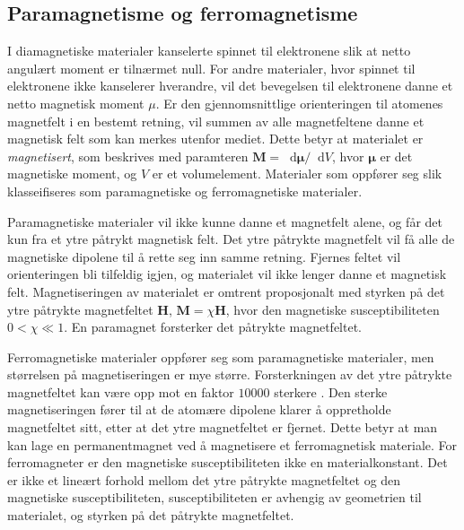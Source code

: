 \documentclass[%
 reprint,
 amsmath,amssymb,
 aps,
]{revtex4-1}
\newcommand*\diff{\mathop{}\!\mathrm{d}}
\begin{document}
\subsection{Paramagnetisme og ferromagnetisme}
I diamagnetiske materialer kanselerte spinnet til elektronene slik at netto angulært moment er tilnærmet null. For andre materialer, hvor spinnet til elektronene ikke kanselerer hverandre, vil det bevegelsen til elektronene danne et netto magnetisk moment $\mu$. Er den gjennomsnittlige orienteringen til atomenes magnetfelt i en bestemt retning, vil summen av alle magnetfeltene danne et magnetisk felt som kan merkes utenfor mediet. Dette betyr at materialet er \textit{magnetisert}, som beskrives med paramteren $\bm{M} = \diff\bm{\mu}/\diff V$, hvor $\bm{\mu}$ er det magnetiske moment, og $V$ er et volumelement. Materialer som oppfører seg slik klasseifiseres som paramagnetiske og ferromagnetiske materialer.\par
Paramagnetiske materialer vil ikke kunne danne et magnetfelt alene, og får det kun fra et ytre påtrykt magnetisk felt. Det ytre påtrykte magnetfelt vil få alle de magnetiske dipolene til å rette seg inn samme retning. Fjernes feltet vil orienteringen bli tilfeldig igjen, og materialet vil ikke lenger danne et magnetisk felt. Magnetiseringen av materialet er omtrent proposjonalt med styrken på det ytre påtrykte magnetfeltet $\bm{H}$, $\bm{M} = \chi\bm{H}$, hvor den magnetiske susceptibiliteten $0<\chi\ll1$. En paramagnet forsterker det påtrykte magnetfeltet.
\par
Ferromagnetiske materialer oppfører seg som paramagnetiske materialer, men størrelsen på magnetiseringen er mye større. Forsterkningen av det ytre påtrykte magnetfeltet kan være opp mot en faktor $10 000$ sterkere \cite{oppgave}. Den sterke magnetiseringen fører til at de atomære dipolene klarer å oppretholde magnetfeltet sitt, etter at det ytre magnetfeltet er fjernet. Dette betyr at man kan lage en permanentmagnet ved å magnetisere et ferromagnetisk materiale. For ferromagneter er den magnetiske susceptibiliteten ikke en materialkonstant. Det er ikke et lineært forhold mellom det ytre påtrykte magnetfeltet og den magnetiske susceptibiliteten, susceptibiliteten er avhengig av geometrien til materialet, og styrken på det påtrykte magnetfeltet.
\end{document}
